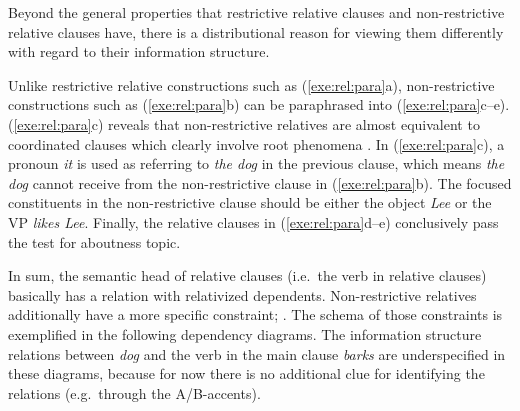 Beyond the general properties that restrictive relative clauses and
non-re\-stric\-tive relative clauses have, there is a distributional
reason for viewing them differently with regard to their information
structure.


\largerpage[-1]
\noindent Unlike restrictive relative constructions such as
(\ref{exe:rel:para}a), non-re\-stric\-tive
constructions such as (\ref{exe:rel:para}b) can be paraphrased into
(\ref{exe:rel:para}c--e). (\ref{exe:rel:para}c) reveals that
non-re\-stric\-tive relatives are almost equivalent to coordinated clauses
which clearly involve root phenomena
\citep[177]{heycock:07}. In
(\ref{exe:rel:para}c), a pronoun \textit{it} is used as referring to
\textit{the dog} in the previous clause, which means \textit{the dog}
cannot receive  from the non-restrictive clause in
(\ref{exe:rel:para}b). The focused constituents in the non-restrictive
clause should be either the object \textit{Lee} or the VP
\textit{likes Lee}.  Finally, the relative clauses in
(\ref{exe:rel:para}d--e) conclusively pass the test for aboutness
topic.














In sum, the semantic head of relative clauses (i.e.\ the verb in
relative clauses) basically has a  relation with
relativized dependents. Non-re\-stric\-tive relatives
additionally have a more specific constraint;
. The schema of those constraints is exemplified
in the following dependency diagrams. The information structure
relations between \textit{dog} and the verb in the main clause
\textit{barks} are underspecified in these diagrams, because for now
there is no additional clue for identifying the relations
(e.g.\ through the A/B-accents).



